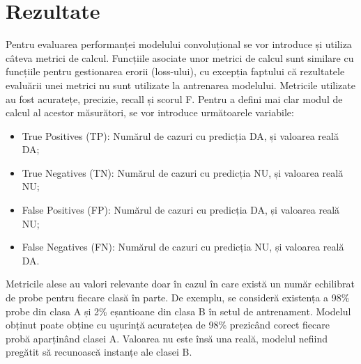 \documentclass[a4paper,12pt]{report}
\begin{document}

\newpage
\section{Rezultate}
Pentru evaluarea performanței modelului convoluțional 
se vor introduce și utiliza câteva metrici de calcul.
Funcțiile asociate unor metrici de calcul sunt similare 
cu funcțiile pentru gestionarea erorii (loss-ului), 
cu excepția faptului că rezultatele evaluării unei metrici 
nu sunt utilizate la antrenarea modelului.
Metricile utilizate au fost acuratețe, precizie, recall și scorul F. 
Pentru a defini mai clar modul de calcul al acestor măsurători, se vor 
introduce următoarele variabile:
\begin{itemize}
    \item True Positives (TP): Numărul de cazuri cu predicția DA, 
    și valoarea reală DA;
    \item True Negatives (TN): Numărul de cazuri cu predicția NU, 
    și valoarea reală NU;
    \item False Positives (FP): Numărul de cazuri cu predicția DA, 
    și valoarea reală NU;
    \item False Negatives (FN): Numărul de cazuri cu predicția NU, 
    și valoarea reală DA.
\end{itemize}

Metricile alese au valori relevante doar în cazul în care există un  
număr echilibrat de probe pentru fiecare clasă în parte. 
De exemplu, se consideră existența a 98\% probe din clasa A și 2\% 
eșantioane din clasa B în setul de antrenament. Modelul obținut 
poate obține cu ușurință acuratețea de 98\% prezicând corect fiecare 
probă aparținând clasei A. Valoarea nu este însă una reală, modelul 
nefiind pregătit să recunoască instanțe ale clasei B. 
\end{document}
